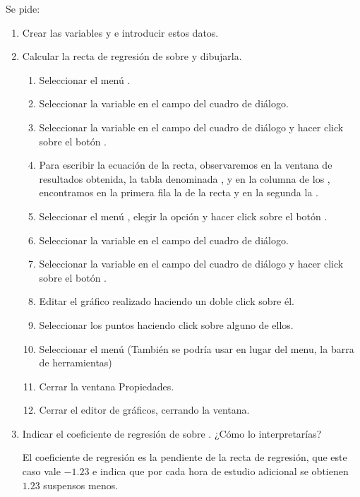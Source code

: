 \begin{enumerate}[leftmargin=*]
Se pide:
\begin{enumerate}
\item  Crear las variables  y  
e introducir estos datos.
\item  Calcular la recta de regresión de  sobre 
 y dibujarla.
\begin{indicacion}
\begin{enumerate}
\item Seleccionar el menú .
\item Seleccionar la variable  en el campo 
 del cuadro de diálogo.
\item Seleccionar la variable  en el campo 
 del cuadro de diálogo y hacer
click sobre el botón .
\item Para escribir la ecuación de la recta, observaremos en la ventana 
de resultados obtenida, la tabla denominada
, y en la columna  de los 
, encontramos
en la primera fila la  de la recta y en la segunda 
la .
\item Seleccionar el menú , elegir la opción  y  
hacer click sobre el botón . 
\item Seleccionar la variable  en el 
campo  del cuadro de diálogo. 
\item Seleccionar la variable  en el campo 
 del cuadro de diálogo y hacer click
sobre el botón .
\item Editar el gráfico realizado haciendo un doble click sobre él.
\item Seleccionar los puntos haciendo click sobre alguno de ellos.
\item Seleccionar el menú  
(También se podría usar en lugar del menu, la barra de herramientas)
\item Cerrar la ventana Propiedades. 
\item Cerrar el editor de gráficos, cerrando la ventana.
\end{enumerate}
\end{indicacion}

\item Indicar el coeficiente de regresión de  sobre 
. ¿Cómo lo interpretarías?
\begin{indicacion}
El coeficiente de regresión es la pendiente de la recta de regresión, 
que este caso vale $-1.23$ e indica que por cada hora de estudio 
adicional se obtienen $1.23$ suspensos menos.
\end{indicacion}


\end{enumerate}
\end{enumerate}
